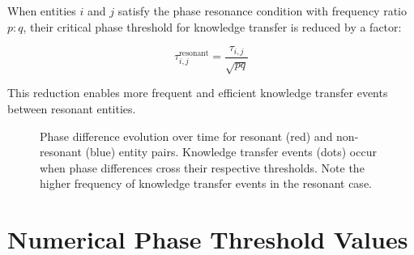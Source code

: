 \begin{theorem}
When entities $i$ and $j$ satisfy the phase resonance condition with frequency ratio $p:q$, their critical phase threshold for knowledge transfer is reduced by a factor:

\begin{equation}
\tau_{i,j}^{\text{resonant}} = \frac{\tau_{i,j}}{\sqrt{pq}}
\end{equation}

This reduction enables more frequent and efficient knowledge transfer events between resonant entities.
\end{theorem}

\begin{figure}[ht]
\centering
{}
\caption{Phase difference evolution over time for resonant (red) and non-resonant (blue) entity pairs. Knowledge transfer events (dots) occur when phase differences cross their respective thresholds. Note the higher frequency of knowledge transfer events in the resonant case.}
\label{fig:resonant_threshold_crossing}
\end{figure}

\section{Numerical Phase Threshold Values}

